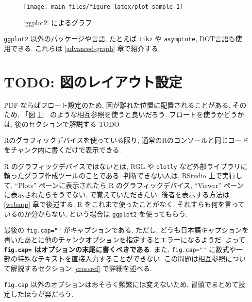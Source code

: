 \documentclass[
  nomag]{bxjsbook}
\newenvironment{Shaded}{\begin{snugshade}}{\end{snugshade}}
\newcommand{\DataTypeTok}[1]{\textcolor[rgb]{0.13,0.29,0.53}{#1}}
\newcommand{\FloatTok}[1]{\textcolor[rgb]{0.00,0.00,0.81}{#1}}
\newcommand{\KeywordTok}[1]{\textcolor[rgb]{0.13,0.29,0.53}{\textbf{#1}}}
\newcommand{\NormalTok}[1]{#1}
\newcommand{\OperatorTok}[1]{\textcolor[rgb]{0.81,0.36,0.00}{\textbf{#1}}}
\newcommand{\StringTok}[1]{\textcolor[rgb]{0.31,0.60,0.02}{#1}}
\theoremstyle{definition}
\theoremstyle{definition}
\theoremstyle{definition}
\theoremstyle{remark}
\begin{document}
\begin{figure}

{\centering \texttt{[image: main\_files/figure-latex/plot-sample-1]} 

}

\caption{`ggplot2` によるグラフ}\label{fig:plot-sample}
\end{figure}

\texttt{ggplot2} 以外のパッケージや言語, たとえば \texttt{tikz} や
\texttt{asymptote}, DOT言語も使用できる. これらは \ref{advanced-graph}
章で紹介する.

\hypertarget{todo-ux56f3ux306eux30ecux30a4ux30a2ux30a6ux30c8ux8a2dux5b9a}{%
\section{TODO:
図のレイアウト設定}\label{todo-ux56f3ux306eux30ecux30a4ux30a2ux30a6ux30c8ux8a2dux5b9a}}

PDF ならばフロート設定のため, 図が離れた位置に配置されることがある.
そのため, 「図 \ref{fig:plot-sample}」
のような相互参照を使うと良いだろう. フロートを使うかどうかは,
後のセクションで解説する TODO

Rのグラフィックデバイスを使っている限り,
通常のRのコンソールと同じコードをチャンク内に書くだけで表示できる.

R のグラフィックデバイスではないとは, RGL や \texttt{plotly}
など外部ライブラリに頼ったグラフ作成ツールのことである.
判断できない人は, RStudio 上で実行して, ``Plots'' ペーンに表示されたら R
のグラフィックデバイス, ``Viewer'' ペーンに表示されたらそうでない,
で覚えていただきたい. 後者を表示する方法は \ref{webapp} 章で後述する. R
をこれまで使ったことがなく, それすらも何を言っているのか分からない,
という場合は \texttt{ggplot2} を使ってもらう.

最後の \texttt{fig.cap=""} がキャプションである. ただし,
どうも日本語キャプションを書いたあとに他のチャンクオプションを指定するとエラーになるようだ.
よって \textbf{\texttt{fig.cap=} はオプションの末尾に書くべきである}.
また, \texttt{fig.cap=""}
に数式や一部の特殊なテキストを直接入力することができない.
この問題は相互参照について解説するセクション \ref{crossref}
で詳細を述べる.

\texttt{fig.cap} 以外のオプションはおそらく頻繁には変えないため,
冒頭でまとめて設定したほうが楽だろう.

\begin{Shaded}
\end{Shaded}
\end{document}
